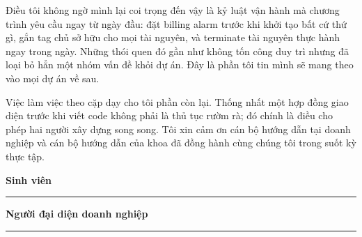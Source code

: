 Điều tôi không ngờ mình lại coi trọng đến vậy là kỷ luật vận hành mà chương
trình yêu cầu ngay từ ngày đầu: đặt billing alarm trước khi khởi tạo bất cứ thứ
gì, gắn tag chủ sở hữu cho mọi tài nguyên, và terminate tài nguyên thực hành
ngay trong ngày. Những thói quen đó gần như không tốn công duy trì nhưng đã loại
bỏ hẳn một nhóm vấn đề khỏi dự án. Đây là phần tôi tin mình sẽ mang theo vào mọi
dự án về sau.

Việc làm việc theo cặp dạy cho tôi phần còn lại. Thống nhất một hợp đồng giao
diện trước khi viết code không phải là thủ tục rườm rà; đó chính là điều cho
phép hai người xây dựng song song. Tôi xin cảm ơn cán bộ hướng dẫn tại doanh
nghiệp và cán bộ hướng dẫn của khoa đã đồng hành cùng chúng tôi trong suốt kỳ
thực tập.

\newpage
\vspace*{1cm}

\noindent
\begin{minipage}[t]{0.45\textwidth}
    \centering
    \textbf{Sinh viên}\\[0.2cm]

    \vspace{2.2cm}

    \rule{0.8\linewidth}{0.4pt}
\end{minipage}
\hfill
\begin{minipage}[t]{0.45\textwidth}
    \centering
    \textbf{Người đại diện doanh nghiệp}\\[0.2cm]

    \vspace{2.2cm}

    \rule{0.8\linewidth}{0.4pt}
\end{minipage}
